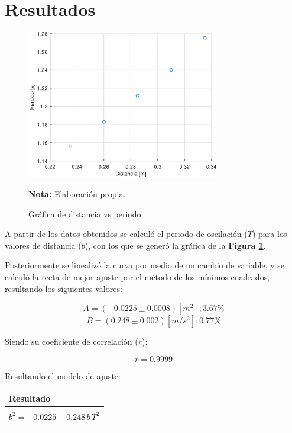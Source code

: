 \documentclass[letter,11pt]{article}
\newcommand{\source}[1]{\vspace{-11pt} \caption*{\small{\textbf{Nota:} {#1}}}}
\begin{document}
\section{Resultados}

\begin{figure}
\centering
\includegraphics[width=0.75\textwidth]{resources/o1.1.eps}
\caption{Gráfica de distancia vs periodo.}
\label{figura5}
\source{Elaboración propia.}
\end{figure}

A partir de los datos obtenidos se calculó el periodo de oscilación ($T$) para
los valores de distancia ($b$), con los que se generó la gráfica de la
\textbf{Figura \ref{figura5}}.

Posteriormente se linealizó la curva por medio de un cambio de variable, y se
calculó la recta de mejor ajuste por el método de los mínimos cuadrados,
resultando los siguientes valores:

\begin{equation*}
    A = (-0.0225 \pm 0.0008) [m^2]; 3.67\%
\end{equation*}
\begin{equation*}
    B = (0.248 \pm 0.002) [m/s^2]; 0.77\%
\end{equation*}
\vspace{0.10cm}

Siendo su coeficiente de correlación ($r$):

\begin{equation*}
    r = 0.9999
\end{equation*}
\vspace{0.10cm}

Resultando el modelo de ajuste:

\begin{center}
\begin{tabular}{|>{\centering}m{9.2cm}<{\centering}|}
\hline
\textbf{Resultado} 
\tabularnewline \hline
\\
$b^2 = -0.0225 + 0.248\,b\,T^2$ \tabularnewline
\\
\hline
\end{tabular}
\end{center}
\vspace{0.10cm}
\end{document}
